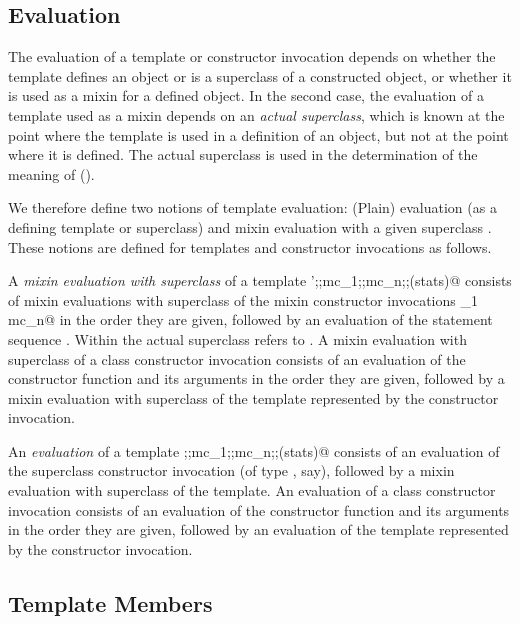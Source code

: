 \documentclass[11pt]{report}
\begin{document}
\subsection{Evaluation}

The evaluation of a template or constructor invocation depends on
whether the template defines an object or is a superclass of a
constructed object, or whether it is used as a mixin for a defined
object.  In the second case, the evaluation of a template used as a
mixin depends on an {\em actual superclass}, which is known at the
point where the template is used in a definition of an object, but not
at the point where it is defined. The actual superclass is used in the
determination of the meaning of \verb@super@ ().

We therefore define two notions of template evaluation: (Plain)
evaluation (as a defining template or superclass) and mixin evaluation
with a given superclass \verb@sc@. These notions are defined for templates
and constructor invocations as follows.

A {\em mixin evaluation with superclass \verb@sc@} of a template
\verb@sc';\WITH;mc_1;\WITH;mc_n;\WITH;(stats)@ consists of mixin
evaluations with superclass \verb@sc@ of the mixin constructor invocations
\verb@mc_1 \commadots mc_n@ in the order they are given, followed by an
evaluation of the statement sequence \verb@stats@.  Within \verb@stats@ the
actual superclass refers to \verb@sc@.  A mixin evaluation with superclass
\verb@sc@ of a class constructor invocation \verb@ci@ consists of an evaluation
of the constructor function and its arguments in the order they are
given, followed by a mixin evaluation with superclass \verb@sc@ of the
template represented by the constructor invocation.

An {\em evaluation} of a template
\verb@sc;\WITH;mc_1;\WITH;mc_n;\WITH;(stats)@ consists of an evaluation of
the superclass constructor invocation \verb@sc@ (of type \verb@S@, say),
followed by a mixin evaluation with superclass \verb@sc@ of the template. An
evaluation of a class constructor invocation \verb@ci@ consists of an
evaluation of the constructor function and its arguments in
the order they are given, followed by an evaluation of the template
represented by the constructor invocation.

\subsection{Template Members}
\end{document}
